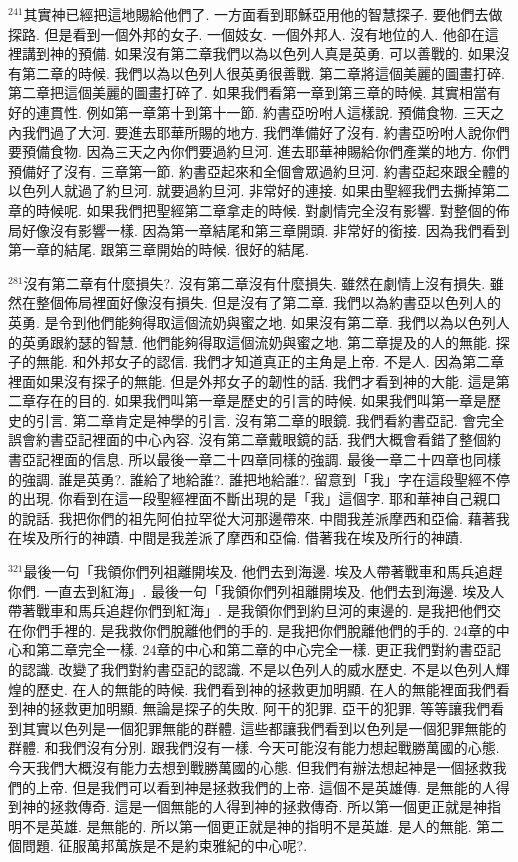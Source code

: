 \documentclass{book}
\begin{document}
$^{241}$其實神已經把這地賜給他們了.
一方面看到耶穌亞用他的智慧探子.
要他們去做探路.
但是看到一個外邦的女子.
一個妓女.
一個外邦人.
沒有地位的人.
他卻在這裡講到神的預備.
如果沒有第二章我們以為以色列人真是英勇.
可以善戰的.
如果沒有第二章的時候.
我們以為以色列人很英勇很善戰.
第二章將這個美麗的圖畫打碎.
第二章把這個美麗的圖畫打碎了.
如果我們看第一章到第三章的時候.
其實相當有好的連貫性.
例如第一章第十到第十一節.
約書亞吩咐人這樣說.
預備食物.
三天之內我們過了大河.
要進去耶華所賜的地方.
我們準備好了沒有.
約書亞吩咐人說你們要預備食物.
因為三天之內你們要過約旦河.
進去耶華神賜給你們產業的地方.
你們預備好了沒有.
三章第一節.
約書亞起來和全個會眾過約旦河.
約書亞起來跟全體的以色列人就過了約旦河.
就要過約旦河.
非常好的連接.
如果由聖經我們去撕掉第二章的時候呢.
如果我們把聖經第二章拿走的時候.
對劇情完全沒有影響.
對整個的佈局好像沒有影響一樣.
因為第一章結尾和第三章開頭.
非常好的銜接.
因為我們看到第一章的結尾.
跟第三章開始的時候.
很好的結尾.

$^{281}$沒有第二章有什麼損失?.
沒有第二章沒有什麼損失.
雖然在劇情上沒有損失.
雖然在整個佈局裡面好像沒有損失.
但是沒有了第二章.
我們以為約書亞以色列人的英勇.
是令到他們能夠得取這個流奶與蜜之地.
如果沒有第二章.
我們以為以色列人的英勇跟約瑟的智慧.
他們能夠得取這個流奶與蜜之地.
第二章提及的人的無能.
探子的無能.
和外邦女子的認信.
我們才知道真正的主角是上帝.
不是人.
因為第二章裡面如果沒有探子的無能.
但是外邦女子的韌性的話.
我們才看到神的大能.
這是第二章存在的目的.
如果我們叫第一章是歷史的引言的時候.
如果我們叫第一章是歷史的引言.
第二章肯定是神學的引言.
沒有第二章的眼鏡.
我們看約書亞記.
會完全誤會約書亞記裡面的中心內容.
沒有第二章戴眼鏡的話.
我們大概會看錯了整個約書亞記裡面的信息.
所以最後一章二十四章同樣的強調.
最後一章二十四章也同樣的強調.
誰是英勇?.
誰給了地給誰?.
誰把地給誰?.
留意到「我」字在這段聖經不停的出現.
你看到在這一段聖經裡面不斷出現的是「我」這個字.
耶和華神自己親口的說話.
我把你們的祖先阿伯拉罕從大河那邊帶來.
中間我差派摩西和亞倫.
藉著我在埃及所行的神蹟.
中間是我差派了摩西和亞倫.
借著我在埃及所行的神蹟.

$^{321}$最後一句「我領你們列祖離開埃及.
他們去到海邊.
埃及人帶著戰車和馬兵追趕你們.
一直去到紅海」.
最後一句「我領你們列祖離開埃及.
他們去到海邊.
埃及人帶著戰車和馬兵追趕你們到紅海」.
是我領你們到約旦河的東邊的.
是我把他們交在你們手裡的.
是我救你們脫離他們的手的.
是我把你們脫離他們的手的.
24章的中心和第二章完全一樣.
24章的中心和第二章的中心完全一樣.
更正我們對約書亞記的認識.
改變了我們對約書亞記的認識.
不是以色列人的威水歷史.
不是以色列人輝煌的歷史.
在人的無能的時候.
我們看到神的拯救更加明顯.
在人的無能裡面我們看到神的拯救更加明顯.
無論是探子的失敗.
阿干的犯罪.
亞干的犯罪.
等等讓我們看到其實以色列是一個犯罪無能的群體.
這些都讓我們看到以色列是一個犯罪無能的群體.
和我們沒有分別.
跟我們沒有一樣.
今天可能沒有能力想起戰勝萬國的心態.
今天我們大概沒有能力去想到戰勝萬國的心態.
但我們有辦法想起神是一個拯救我們的上帝.
但是我們可以看到神是拯救我們的上帝.
這個不是英雄傳.
是無能的人得到神的拯救傳奇.
這是一個無能的人得到神的拯救傳奇.
所以第一個更正就是神指明不是英雄.
是無能的.
所以第一個更正就是神的指明不是英雄.
是人的無能.
第二個問題.
征服萬邦萬族是不是約束雅紀的中心呢?.
\end{document}
